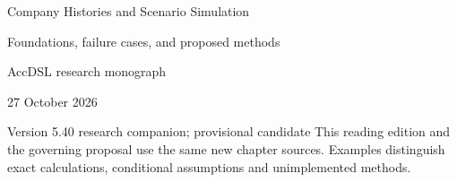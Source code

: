 \documentclass[11pt,a4paper]{report}
\begin{document}
\hypersetup{pageanchor=false}
\begin{titlepage}
{\Huge Company Histories and Scenario Simulation\par}
\vspace{12mm}
{\Large Foundations, failure cases, and proposed methods\par}
\vspace{8mm}
AccDSL research monograph\par 27 October 2026\par Version 5.40 research companion; provisional candidate
\vfill
This reading edition and the governing proposal use the same new chapter sources. Examples distinguish exact calculations, conditional assumptions and unimplemented methods.
\end{titlepage}
\hypersetup{pageanchor=true}
\tableofcontents
\clearpage{}


























\clearpage\label{sim:body-end}

\begingroup\raggedright
\endgroup
\end{document}
